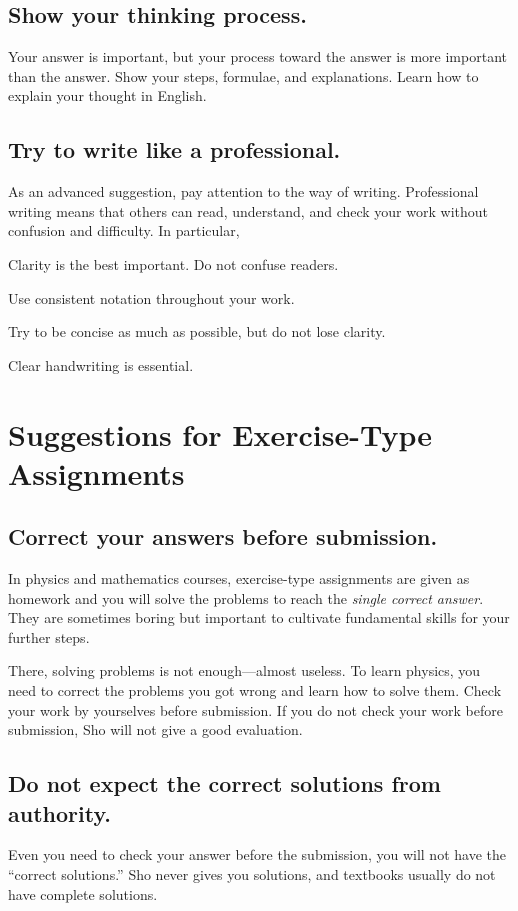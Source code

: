 \documentclass[11pt,pdfa,lastpage,minititle]{MishoNote}
\begin{document}
\subsection{Show your thinking process.}
Your answer is important, but your process toward the answer is more important than the answer.
Show your steps, formulae, and explanations.
Learn how to explain your thought in English.

\subsection{Try to write like a professional.}
As an advanced suggestion, pay attention to the way of writing.
Professional writing means that others can read, understand, and check your work without confusion and difficulty. In particular,
\begin{miniitemize}
  \item Clarity is the best important. Do not confuse readers.
  \item Use consistent notation throughout your work.
  \item Try to be concise as much as possible, but do not lose clarity.
  \item Clear handwriting is essential.
\end{miniitemize}

\section*{Suggestions for Exercise-Type Assignments}
\subsection{Correct your answers before submission.}
In physics and mathematics courses, exercise-type assignments are given as homework and you will solve the problems to reach the \emph{single correct answer}.
They are sometimes boring but important to cultivate fundamental skills for your further steps.

There, solving problems is not enough---almost useless.
To learn physics, you need to correct the problems you got wrong and learn how to solve them.
Check your work by yourselves before submission.
If you do not check your work before submission, Sho will not give a good evaluation.

\subsection{Do not expect the correct solutions from authority.}
Even you need to check your answer before the submission, you will not have the ``correct solutions.''
Sho never gives you solutions, and textbooks usually do not have complete solutions.
\end{document}
